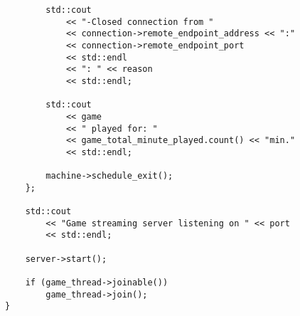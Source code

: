 \begin{verbatim}
		std::cout
			<< "-Closed connection from "
			<< connection->remote_endpoint_address << ":"
			<< connection->remote_endpoint_port
			<< std::endl
			<< ": " << reason
			<< std::endl;

		std::cout
			<< game
			<< " played for: " 
			<< game_total_minute_played.count() << "min."
			<< std::endl;

		machine->schedule_exit();
	};

	std::cout
		<< "Game streaming server listening on " << port
		<< std::endl;

	server->start();

	if (game_thread->joinable())
		game_thread->join();
}
\end{verbatim}